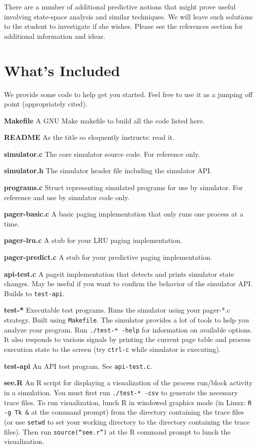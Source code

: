 \documentclass[12pt]{article}
\newenvironment{packed_enum}{
\begin{enumerate}
  \setlength{\itemsep}{1pt}
  \setlength{\parskip}{0pt}
  \setlength{\parsep}{0pt}
}{\end{enumerate}}
\begin{document}
There are a number of additional predictive notions that might prove
useful involving state-space analysis and similar techniques. We
will leave such solutions to the student to investigate if she
wishes. Please see the references section for additional information
and ideas.

\section{What's Included}

We provide some code to help get you started. Feel free to use it as a
jumping off point (appropriately cited).

\begin{packed_enum}
\item {\bf Makefile} A GNU Make makefile to build all the code listed
  here.
\item {\bf README} As the title so eloquently instructs: read it.
\item {\bf simulator.c} The core simulator source code. For reference
  only.
\item {\bf simulator.h} The simulator header file including the simulator
  API.
\item {\bf programs.c} Struct representing simulated programs for use
  by simulator. For reference and use by simulator code only.
\item {\bf pager-basic.c} A basic paging implementation that only runs
  one process at a time.
\item {\bf pager-lru.c} A stub for your LRU paging implementation.
\item {\bf pager-predict.c} A stub for your predictive paging implementation.
\item {\bf api-test.c} A pageit implementation that detects and prints
  simulator state changes. May be useful if you want to confirm the
  behavior of the simulator API. Builds to \texttt{test-api}.
\item {\bf test-*} Executable test programs. Runs the simulator using
  your pager-*.c strategy. Built using \texttt{Makefile}. The simulator
  provides a lot of tools to help you analyze your program.
  Run \texttt{./test-* -help} for information on available options. It
  also responds to various signals by printing the current page table
  and process execution state to the screen (try \texttt{ctrl-c} while
  simulator is executing).
\item {\bf test-api} An API test program. See \texttt{api-test.c}.
\item {\bf see.R} An R script for displaying a visualization of the
  process run/block activity in a simulation.
  You must first run \texttt{./test-* -csv} to
  generate the necessary trace files. To run visualization, lunch R in
  windowed graphics mode (in Linux: \texttt{R -g Tk \&} at the command
  prompt) from the directory containing the trace
  files (or use \texttt{setwd} to set your working directory to the directory
  containing the trace files). Then run \texttt{source(``see.r'')} at the R
  command prompt to lunch the visualization.
\end{packed_enum}
\end{document}
